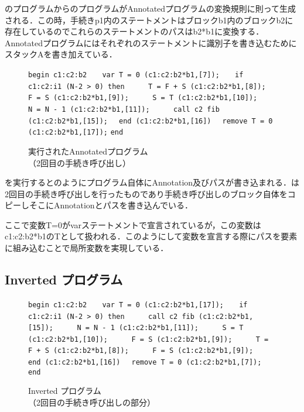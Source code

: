 \documentclass[submit,PRO]{ipsj}
\def\|{\verb|}
\begin{document}
のプログラムからのプログラムがAnnotatedプログラムの変換規則に則って生成される．この時，手続きp1内のステートメントはブロックb1内のブロックb2に存在しているのでこれらのステートメントのパスはb2*b1に変換する．Annotatedプログラムにはそれぞれのステートメントに識別子を書き込むためにスタックAを書き加えている．


\begin{figure}[tb]
\vbox{
\hbox{\|begin c1:c2:b2|}
\hbox{\|   var T = 0 (c1:c2:b2*b1,[7]);|}
\hbox{\|   if c1:c2:i1 (N-2 > 0) then|}
\hbox{\|     T = F + S (c1:c2:b2*b1,[8]);|}
\hbox{\|     F = S (c1:c2:b2*b1,[9]);|}
\hbox{\|     S = T (c1:c2:b2*b1,[10]);|}
\hbox{\|     N = N - 1 (c1:c2:b2*b1,[11]);|}
\hbox{\|     call c2 fib (c1:c2:b2*b1,[15]);|}
\hbox{\|  end (c1:c2:b2*b1,[16])|}
\hbox{\|  remove T = 0 (c1:c2:b2*b1,[17]);|}
\hbox{\|end|}
}
\centerline{}
\caption{実行されたAnnotatedプログラム\\
（2回目の手続き呼び出し）}
\label{fig:Hexec}
\end{figure}


を実行するとのようにプログラム自体にAnnotation及びパスが書き込まれる．は2回目の手続き呼び出しを行ったものであり手続き呼び出しのブロック自体をコピーしそこにAnnotationとパスを書き込んでいる．

ここで変数T=0がvarステートメントで宣言されているが，この変数はc1:c2:b2*b1のTとして扱われる．このようにして変数を宣言する際にパスを要素に組み込むことで局所変数を実現している．

\subsection{Inverted プログラム}
\begin{figure}[tb]
\vbox{
\hbox{\|begin c1:c2:b2|}
\hbox{\|   var T = 0 (c1:c2:b2*b1,[17]);|}
\hbox{\|   if c1:c2:i1 (N-2 > 0) then|}
\hbox{\|     call c2 fib (c1:c2:b2*b1,[15]);|}
\hbox{\|     N = N - 1 (c1:c2:b2*b1,[11]);|}
\hbox{\|     S = T (c1:c2:b2*b1,[10]);|}
\hbox{\|     F = S (c1:c2:b2*b1,[9]);|}
\hbox{\|     T = F + S (c1:c2:b2*b1,[8]);|}
\hbox{\|     F = S (c1:c2:b2*b1,[9]);|}
\hbox{\|  end (c1:c2:b2*b1,[16])|}
\hbox{\|  remove T = 0 (c1:c2:b2*b1,[7]);|}
\hbox{\|end|}
}
\centerline{}
\caption{Inverted プログラム\\
（2回目の手続き呼び出しの部分）}
\label{fig:Hinvprogram}
\end{figure}
\end{document}
